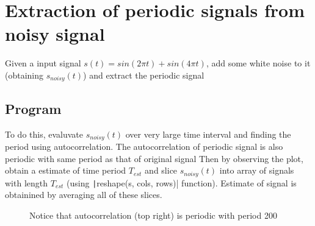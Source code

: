 \section{Extraction of periodic signals from noisy signal}

Given a input signal $s(t) = sin(2\pi t) + sin(4\pi t)$, add some white noise to it (obtaining $s_{noisy}(t)$)
and extract the periodic signal

\subsection*{Program}
To do this, evaluvate $s_{noisy}(t)$ over very large time interval and
finding the period using autocorrelation.
The autocorrelation of periodic signal is also periodic with same period as that of original signal
Then by observing the plot, obtain a estimate of time period $T_{est}$ and
slice $s_{noisy}(t)$ into array of signals with length $T_{est}$ (using \texttt|reshape(s, cols, rows)| function).
Estimate of signal is obtainined by averaging all of these slices.


\begin{figure*}[ht!]
	\begin{minipage}{.48\textwidth}
	\end{minipage}%
	\hfill%
	\begin{minipage}{.48\textwidth}
	\end{minipage}
	\caption*{Notice that autocorrelation (top right) is periodic with period 200}
\end{figure*}

